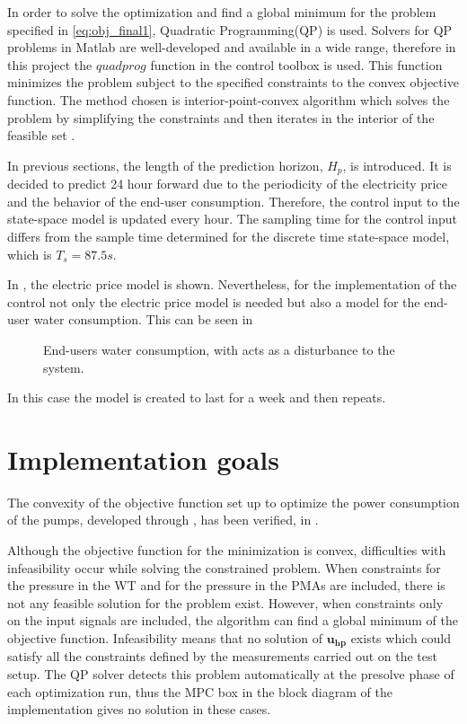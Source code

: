 In order to solve the optimization and find a global minimum for the problem specified in \eqref{eq:obj_final1},  Quadratic Programming(QP) is used. Solvers for QP problems in Matlab are well-developed and available in a wide range, therefore in this project the $quadprog$ function in the control toolbox is used. This function minimizes the problem subject to the specified constraints to the convex objective function. The method chosen is interior-point-convex algorithm which solves the problem by simplifying the constraints and then iterates in the interior of the feasible set \cite{Convex_optimization}. 

In previous sections, the length of the prediction horizon, $H_p$, is introduced. It is decided to predict 24 hour forward due to the periodicity of the electricity price and the behavior of the end-user consumption. Therefore, the control input to the state-space model is updated every hour. The sampling time for the control input differs from the sample time determined for the discrete time state-space model, which is $T_s = 87.5s$. 

In , the electric price model is shown. Nevertheless, for the implementation of the control not only the electric price model is needed but also a model for the end-user water consumption. This can be seen in 

\begin{figure}[H]
\centering
 
\caption{End-users water consumption, with acts as a disturbance to the system.}
\label{fig:water_consumption}
\end{figure}

In this case the model is created to last for a week and then repeats. 


\section{Implementation goals}
The convexity of the objective function set up to optimize the power consumption of the pumps, developed through , has been verified, in . 


Although the objective function for the minimization is convex, difficulties with infeasibility occur while solving the constrained problem. When constraints for the pressure in the WT and for the pressure in the PMAs are included, there is not any feasible solution for the problem exist. However, when constraints only on the input signals are included, the algorithm can find a global minimum of the objective function. Infeasibility means that no solution of $\bm{u_{hp}}$ exists which could satisfy all the constraints defined by the measurements carried out on the test setup. The QP solver detects this problem automatically at the presolve phase of each optimization run, thus the MPC box in the block diagram of the implementation gives no solution in these cases. 

